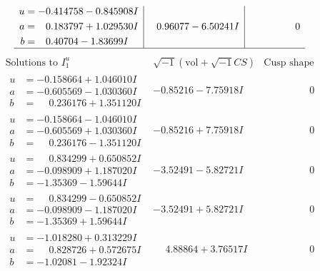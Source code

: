 \documentclass[1p]{elsarticle_modified}
\theoremstyle{definition}
\newcommand{\I}{\sqrt{-1}}
\begin{document}
$$\begin{array}{c|c|c}
\begin{aligned}
u &= -0.414758 - 0.845908 I \\
a &= \phantom{-}0.183797 + 1.029530 I \\
b &= \phantom{-}0.40704 - 1.83699 I\end{aligned}
 & \phantom{-}0.96077 - 6.50241 I & \phantom{-0.000000 } 0\\
 \hline 
 \end{array}$$\newpage$$\begin{array}{c|c|c}  
\text{Solutions to }I^u_{1}& \I (\text{vol} + \sqrt{-1}CS) & \text{Cusp shape}\\
 \hline 
\begin{aligned}
u &= -0.158664 + 1.046010 I \\
a &= -0.605569 - 1.030360 I \\
b &= \phantom{-}0.236176 + 1.351120 I\end{aligned}
 & -0.85216 - 7.75918 I & \phantom{-0.000000 } 0 \\ \hline\begin{aligned}
u &= -0.158664 - 1.046010 I \\
a &= -0.605569 + 1.030360 I \\
b &= \phantom{-}0.236176 - 1.351120 I\end{aligned}
 & -0.85216 + 7.75918 I & \phantom{-0.000000 } 0 \\ \hline\begin{aligned}
u &= \phantom{-}0.834299 + 0.650852 I \\
a &= -0.098909 + 1.187020 I \\
b &= -1.35369 - 1.59644 I\end{aligned}
 & -3.52491 - 5.82721 I & \phantom{-0.000000 } 0 \\ \hline\begin{aligned}
u &= \phantom{-}0.834299 - 0.650852 I \\
a &= -0.098909 - 1.187020 I \\
b &= -1.35369 + 1.59644 I\end{aligned}
 & -3.52491 + 5.82721 I & \phantom{-0.000000 } 0 \\ \hline\begin{aligned}
u &= -1.018280 + 0.313229 I \\
a &= \phantom{-}0.828726 + 0.572675 I \\
b &= -1.02081 - 1.92324 I\end{aligned}
 & \phantom{-}4.88864 + 3.76517 I & \phantom{-0.000000 } 0 \\ \hline\begin{aligned}

\end{aligned}
\end{array}$$
\end{document}
